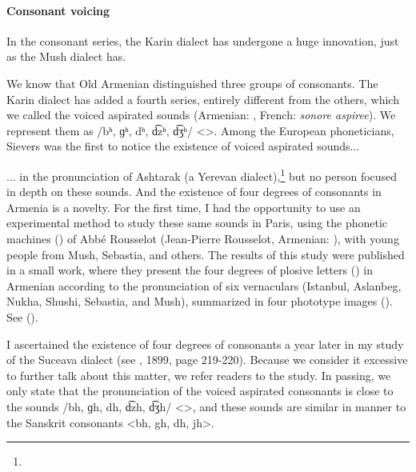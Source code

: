 \paragraph{Consonant voicing}

In the consonant series, the Karin dialect has undergone a huge innovation, just as the Mush dialect has. 

We know that Old Armenian distinguished three groups of consonants. The Karin dialect has added a fourth series, entirely different from the others, which we called the voiced aspirated sounds (Armenian: \textit{}, French: \textit{sonore aspiree}). We represent them as /bʰ, ɡʰ, dʰ, d͡zʰ, d͡ʒʰ/ <>. Among the European phoneticians, Sievers was the first to notice the existence of voiced aspirated sounds... 



\begin{adjarianpage}\label{page:106}\end{adjarianpage}%

... in the pronunciation of Ashtarak (a Yerevan dialect),\footnote{} but no person focused in depth on these sounds. And the existence of four degrees of consonants in Armenia is a novelty. For the first time, I had the opportunity to use an experimental method to study these same sounds in Paris, using the phonetic machines () of Abbé Rousselot (Jean-Pierre Rousselot, Armenian: ), with young people from Mush, Sebastia, and others. The results of this study were published in a small work, where they present the four degrees of plosive letters ()  in Armenian according to the pronunciation of six vernaculars (Istanbul, Aslanbeg, Nukha, Shushi, Sebastia, and Mush), summarized in four phototype images (). See \citet{Adjarian-1899-ArmenianExplosives} (). 

I ascertained the existence of four degrees of consonants a year later in my study of the Suceava dialect (see , 1899, page 219-220). Because we consider it excessive to further talk about this matter, we refer readers to the study. In passing, we only state that the pronunciation of the voiced aspirated consonants is close to the sounds /bh, ɡh, dh, d͡zh, d͡ʒh/ <>, and these sounds are similar in manner to the Sanskrit consonants <bh, gh, dh, jh>. 

